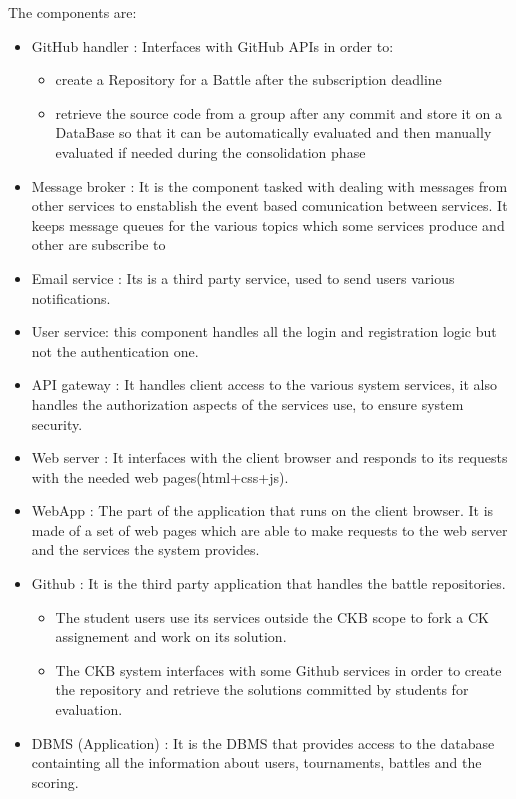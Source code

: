 The components are: 
\begin{itemize}
    \item GitHub handler :    Interfaces with GitHub APIs in order to: 
    \begin{itemize}
        \item create a Repository for a Battle after the subscription deadline
        \item retrieve the source code from a group after any commit and store it on a DataBase so that it can be automatically evaluated and then manually evaluated if needed during the consolidation phase
    \end{itemize}
\item Message broker :  It is the component tasked with dealing with messages from other services to enstablish the event based comunication between services. It keeps message queues for the various topics which some services produce and other are subscribe to
\item Email service :   Its is a third party service, used to send users various notifications.
\item User service: this component handles all the login and registration logic but not the authentication one.
\item API gateway : It handles client access to the various system services, it also handles the authorization aspects of the services use, to ensure system security.
\item Web server : It interfaces with the client browser and responds to its requests with the needed web pages(html+css+js).
\item WebApp : The part of the application that runs on the client browser. It is made of a set of web pages which are able to make requests to the web server and the services the system provides.
\item Github : It is the third party application that handles the battle repositories. 
\begin{itemize}
    \item The student users use its services outside the \ac{CKB} scope to fork a \ac{CK} assignement and work on its solution.
    \item The \ac{CKB} system interfaces with some Github services in order to create the repository and retrieve the solutions committed by students for evaluation.
\end{itemize}
\item DBMS (Application) : It is the DBMS that provides access to the database containting all the information about users, tournaments, battles and the scoring.

\end{itemize}
